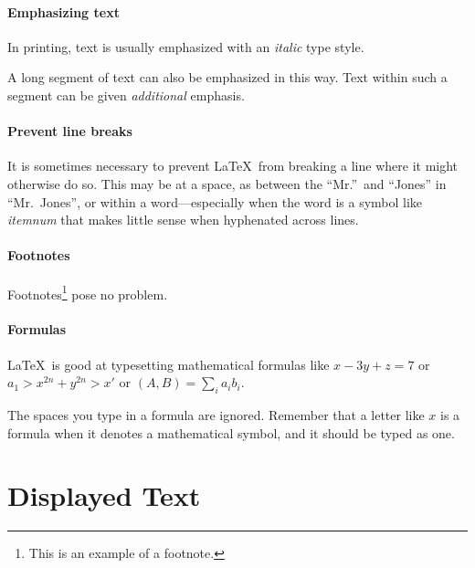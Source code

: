 \documentclass{article}      %
\newcommand{\ip}[2]{(#1, #2)}
\begin{document}
\paragraph{Emphasizing text} In printing, text is usually emphasized with an \emph{italic} type
 style.

\begin{em}
   A long segment of text can also be emphasized
   in this way.  Text within such a segment can be
   given \emph{additional} emphasis.
\end{em}

\paragraph{Prevent line breaks} It is sometimes necessary to prevent \LaTeX\ from breaking a line
 where it might otherwise do so. This may be at a space, as between the ``Mr.''\ and ``Jones'' in
 ``Mr.~Jones'', or within a word---especially when the word is a symbol like 
 \mbox{\emph{itemnum}} that makes little sense when hyphenated across lines. 

\paragraph{Footnotes} Footnotes\footnote{This is an example of a footnote.} pose no problem.

\paragraph{Formulas} \LaTeX\ is good at typesetting mathematical formulas like 
       \( x-3y + z = 7 \)
or 
       \( a_{1} > x^{2n} + y^{2n} > x' \) 
or 
       \( \ip{A}{B} = \sum_{i} a_{i} b_{i} \). 



The spaces you type in a formula are ignored. Remember that a letter like $x$ is a formula when it
denotes a mathematical symbol, and it should be typed as one.


\section{Displayed Text}
\end{document}
